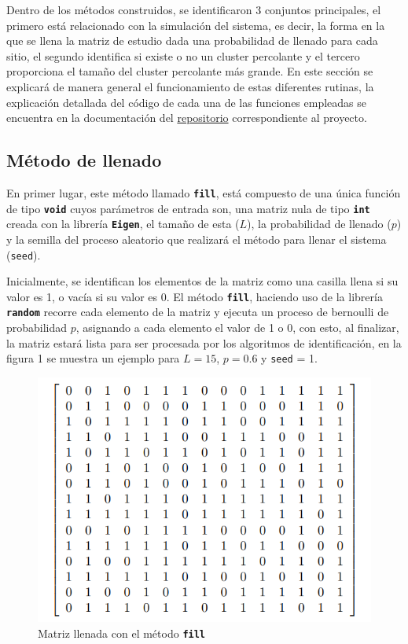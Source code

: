 \documentclass[11pt,twocolumn]{article}
\begin{document}
Dentro de los métodos construidos, se identificaron 3 conjuntos principales, el primero está relacionado con la simulación del sistema, es decir, la forma en la que se llena la matriz de estudio dada una probabilidad de llenado para cada sitio, el segundo identifica si existe o no un cluster percolante y el tercero proporciona el tamaño del cluster percolante más grande. En este sección se explicará de manera general el funcionamiento de estas diferentes rutinas, la explicación detallada del código de cada una de las funciones empleadas se encuentra en la documentación del \href{https://github.com/HerrComp/2022-i-herrcomp-proyectointermedio-nmfj-2dpercolation}{repositorio} correspondiente al proyecto.

\subsection{\textbf{Método de llenado}}
En primer lugar, este método llamado \texttt{\textbf{fill}}, está compuesto de una única función de tipo \texttt{\textbf{void}} cuyos parámetros de entrada son, una matriz nula de tipo \texttt{\textbf{int}} creada con la librería \texttt{\textbf{Eigen}}, el tamaño de esta ($L$), la probabilidad de llenado ($p$) y la semilla del proceso aleatorio que realizará el método para llenar el sistema (\texttt{{seed}}).
\vspace{0.2 cm}

Inicialmente, se identifican los elementos de la matriz como una casilla llena si su valor es 1, o vacía si su valor es 0. El método \texttt{\textbf{fill}}, haciendo uso de la librería \texttt{\textbf{random}} recorre cada elemento de la matriz y ejecuta un proceso de bernoulli de probabilidad $p$, asignando a cada elemento el valor de 1 o 0, con esto, al finalizar, la matriz estará lista para ser procesada por los algoritmos de identificación, en la figura 1 se muestra un ejemplo para $L=15$, $p = 0.6$ y \texttt{seed} = 1.

\begin{figure}[H]
    \centering
    \includegraphics[scale=0.47]{Imagenes/matriz1.png}
    \caption{Matriz llenada con el método \textbf{\texttt{\textbf{fill}}}}
    \label{fill}
\end{figure}
\end{document}
